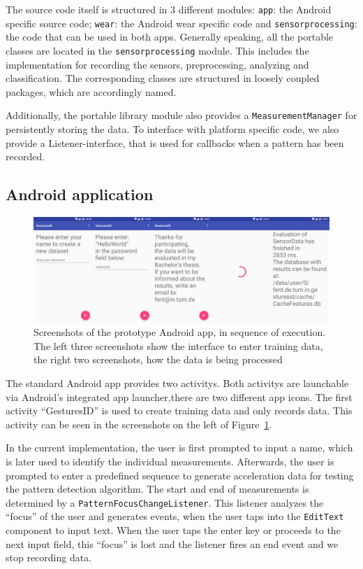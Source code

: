 The source code itself is structured in 3 different modules: \lstinline$app$: the Android specific source code; \lstinline$wear$: the Android wear specific code and \lstinline$sensorprocessing$: the code that can be used in both apps. Generally speaking, all the portable classes are located in the \lstinline$sensorprocessing$ module. This includes the implementation for recording the sensors, preprocessing, analyzing and classification. The corresponding classes are structured in loosely coupled \glspl{package}, which are accordingly named.

Additionally, the portable library module also provides a \lstinline$MeasurementManager$ for persistently storing the data. To interface with platform specific code, we also provide a Listener-interface, that is used for callbacks when a pattern has been recorded.

\subsection{Android application}
\begin{figure}
    \centering
    \includegraphics[width=\textwidth]{figures/MeasurementPhone.png}
    \caption{Screenshots of the prototype Android \gls{app}, in sequence of execution. The left three screenshots show the interface to enter training data, the right two screenshots, how the data is being processed}
    \label{fig:phonescreenshot}
\end{figure}

The standard Android \gls{app} provides two \glspl{activity}. Both \glspl{activity} are launchable via Android's integrated \gls{app} launcher,\ie there are two different \gls{app} icons. The first \gls{activity} ``GesturesID'' is used to create training data and only records data. This activity can be seen in the screenshots on the left of Figure~\ref{fig:phonescreenshot}.

In the current implementation, the user is first prompted to input a name, which is later used to identify the individual measurements. Afterwards, the user is prompted to enter a predefined sequence  to generate acceleration data for testing the pattern detection algorithm. The start and end of measurements is determined by a \lstinline$PatternFocusChangeListener$. This listener analyzes the ``focus'' of the user and generates events, when the user taps into the \lstinline$EditText$ component to input text. When the user taps the enter key or proceeds to the next input field, this ``focus'' is lost and the listener fires an end event and we stop recording data.

